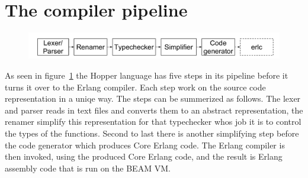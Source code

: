 \section{The compiler pipeline}


\begin{figure}[h!]
\label{fig:pipeline}
\centering
  \includegraphics[width=0.6\pdfpagewidth]{figure/pipeline}
\end{figure}


As seen in figure~\ref{fig:pipeline} the Hopper language has five steps in its 
pipeline before it turns it over to the Erlang compiler. Each step work on the 
source code representation in a uniqe way. The steps can be summerized as
follows. The lexer and parser reads in text files and converts them to an 
abstract representation, the renamer simplify this representation for that 
typechecker whos job it is to control the types of the functions. Second to last 
there is another simplifying step before the code generator which produces Core
Erlang code. The Erlang compiler is then invoked, using the produced Core Erlang
code, and the result is Erlang assembly code that is run on the BEAM VM.
